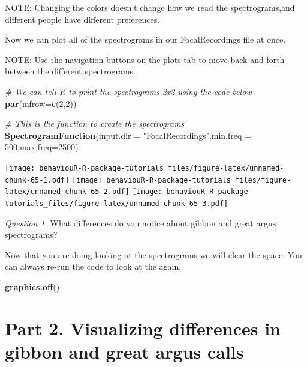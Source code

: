 \documentclass[]{book}
\newenvironment{Shaded}{\begin{snugshade}}{\end{snugshade}}
\newcommand{\CommentTok}[1]{\textcolor[rgb]{0.56,0.35,0.01}{\textit{#1}}}
\newcommand{\DataTypeTok}[1]{\textcolor[rgb]{0.13,0.29,0.53}{#1}}
\newcommand{\DecValTok}[1]{\textcolor[rgb]{0.00,0.00,0.81}{#1}}
\newcommand{\KeywordTok}[1]{\textcolor[rgb]{0.13,0.29,0.53}{\textbf{#1}}}
\newcommand{\NormalTok}[1]{#1}
\newcommand{\StringTok}[1]{\textcolor[rgb]{0.31,0.60,0.02}{#1}}
\begin{document}
NOTE: Changing the colors doesn't change how we read the spectrograms,and different people have different preferences.

Now we can plot all of the spectrograms in our FocalRecordings file at once.

NOTE: Use the navigation buttons on the plots tab to move back and forth between the different spectrograms.

\begin{Shaded}
\begin{Highlighting}[]
\CommentTok{# We can tell R to print the spectrograms 2x2 using the code below}
\KeywordTok{par}\NormalTok{(}\DataTypeTok{mfrow=}\KeywordTok{c}\NormalTok{(}\DecValTok{2}\NormalTok{,}\DecValTok{2}\NormalTok{))}

\CommentTok{# This is the function to create the spectrograms}
\KeywordTok{SpectrogramFunction}\NormalTok{(}\DataTypeTok{input.dir =} \StringTok{"FocalRecordings"}\NormalTok{,}\DataTypeTok{min.freq =} \DecValTok{500}\NormalTok{,}\DataTypeTok{max.freq=}\DecValTok{2500}\NormalTok{)}
\end{Highlighting}
\end{Shaded}

\texttt{[image: behaviouR-R-package-tutorials\_files/figure-latex/unnamed-chunk-65-1.pdf]} \texttt{[image: behaviouR-R-package-tutorials\_files/figure-latex/unnamed-chunk-65-2.pdf]} \texttt{[image: behaviouR-R-package-tutorials\_files/figure-latex/unnamed-chunk-65-3.pdf]}

\emph{Question 1.} What differences do you notice about gibbon and great argus spectrograms?

Now that you are doing looking at the spectrograms we will clear the space. You can always re-run the code to look at the again.

\begin{Shaded}
\begin{Highlighting}[]
\KeywordTok{graphics.off}\NormalTok{()}
\end{Highlighting}
\end{Shaded}

\hypertarget{part-2.-visualizing-differences-in-gibbon-and-great-argus-calls}{%
\section*{Part 2. Visualizing differences in gibbon and great argus calls}\label{part-2.-visualizing-differences-in-gibbon-and-great-argus-calls}}
\end{document}
